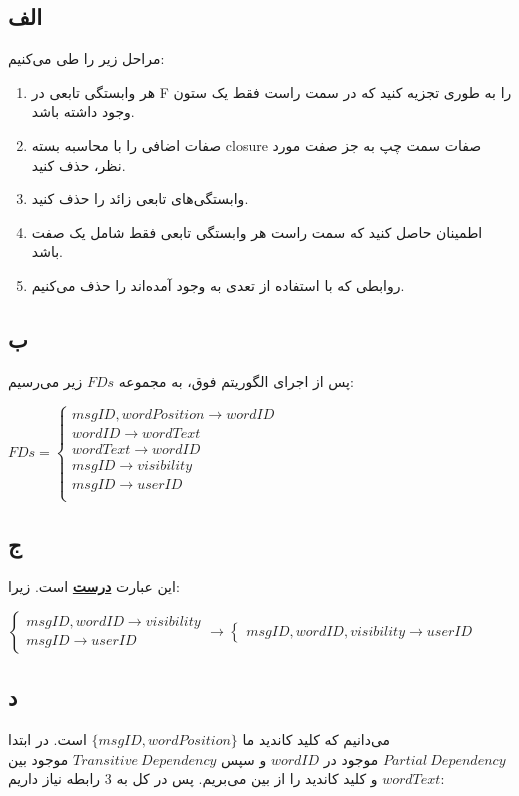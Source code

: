 \subsection*{الف}
مراحل زیر را طی می‌کنیم:
\begin{enumerate}
	\item 
	هر وابستگی تابعی در F را به طوری تجزیه کنید که در سمت راست فقط یک ستون وجود داشته باشد.
	\item 
صفات اضافی را با محاسبه بسته closure صفات سمت چپ به جز صفت مورد نظر، حذف کنید.
\item 
وابستگی‌های تابعی زائد را حذف کنید.
\item
اطمینان حاصل کنید که سمت راست هر وابستگی تابعی فقط شامل یک صفت باشد.
\item 
روابطی که با استفاده از تعدی به وجود آمده‌اند را حذف می‌کنیم.
\end{enumerate}

\subsection*{ب}

پس از اجرای الگوریتم فوق، به مجموعه $FDs$ زیر می‌رسیم:

\setLTR
$
FDs = \begin{cases}
msgID,wordPosition \rightarrow wordID \\
wordID \rightarrow wordText \\
wordText \rightarrow wordID \\
msgID \rightarrow  visibility\\
msgID \rightarrow  userID\\
\end{cases}
$
\setRTL


\subsection*{ج}
این عبارت 
\underline{\textbf{درست}}
است. زیرا:

\setLTR
$
\begin{cases}
	msgID,wordID \rightarrow visibility \\
	msgID \rightarrow userID
\end{cases} \longrightarrow 
\begin{cases}
	msgID,wordID,visibility \rightarrow userID
\end{cases}
$
\setRTL


\subsection*{د}
می‌دانیم که کلید کاندید ما 
$\{msgID,wordPosition\}$
است. در ابتدا 
$Partial \ Dependency$
موجود در $wordID$ و سپس 
$Transitive \ Dependency$
موجود بین 
$wordText$
و کلید کاندید را از بین می‌بریم. پس در کل به 3 رابطه نیاز داریم:

